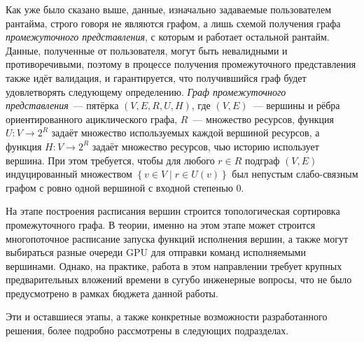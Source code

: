 Как уже было сказано выше, данные, изначально задаваемые пользователем рантайма, строго говоря не являются графом, а лишь схемой получения графа \textit{промежуточного представления}, с которым и работает остальной рантайм.
Данные, полученные от пользователя, могут быть невалидными и противоречивыми, поэтому в процессе получения промежуточного представления также идёт валидация, и гарантируется, что получившийся граф будет удовлетворять следующему определению.
\textit{Граф промежуточного представления}~--- пятёрка $(V, E, R, U, H)$, где $(V, E)$~--- вершины и рёбра ориентированного ациклического графа, $R$~--- множество ресурсов, функция $U : V \to 2^R$ задаёт множество используемых каждой вершиной ресурсов, а функция $H : V \to 2^R$ задаёт множество ресурсов, чью историю использует вершина.
При этом требуется, чтобы для любого $r\in R$ подграф $(V, E)$ индуцированный множеством $\left\{v \in V \middle| r \in U(v)\right\}$ был непустым слабо-связным графом с ровно одной вершиной с входной степенью $0$.

На этапе построения расписания вершин строится топологическая сортировка промежуточного графа.
В теории, именно на этом этапе может строится многопоточное расписание запуска функций исполнения вершин, а также могут выбираться разные очереди GPU для отправки команд исполняемыми вершинами.
Однако, на практике, работа в этом направлении требует крупных предварительных вложений времени в сугубо инженерные вопросы, что не было предусмотрено в рамках бюджета данной работы.

Эти и оставшиеся этапы, а также конкретные возможности разработанного решения, более подробно рассмотрены в следующих подразделах.

